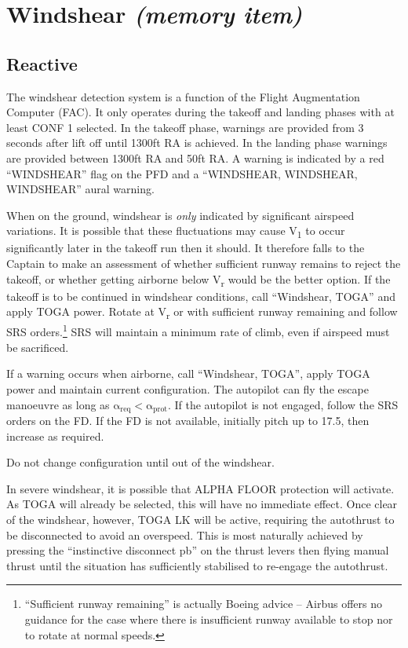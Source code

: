 \documentclass[a5paper,11pt,twoside]{book}
\newcommand{\multicite}[1]{
  \nopagebreak
  \noindent{\footnotesize\color{blue}{[ #1 ]}}
}
\newcommand{\V}[1]{V\textsubscript{#1}}
\begin{document}
\multicite{EOMB~3.80.2, QRH~AEP.MISC, FCOM~AEP.MISC, FCTM~AEP.MISC}


\section{Windshear \emph{(memory item)}}

\subsection{Reactive}

The windshear detection system is a function of the Flight Augmentation Computer
(FAC). It only operates during the takeoff and landing phases with at least CONF
1 selected. In the takeoff phase, warnings are provided from 3 seconds after
lift off until 1300ft RA is achieved. In the landing phase warnings are provided
between 1300ft RA and 50ft RA. A warning is indicated by a red ``WINDSHEAR'' flag
on the PFD and a ``WINDSHEAR, WINDSHEAR, WINDSHEAR'' aural warning.

 When on the ground, windshear is \emph{only} indicated by significant airspeed
 variations. It is possible that these fluctuations may cause \V{1} to occur
 significantly later in the takeoff run then it should. It therefore falls to
 the Captain to make an assessment of whether sufficient runway remains to
 reject the takeoff, or whether getting airborne below \V{r} would be the better
 option. If the takeoff is to be continued in windshear conditions, call
 ``Windshear, TOGA'' and apply TOGA power.  Rotate at \V{r} or with sufficient
 runway remaining and follow SRS orders.\footnote{``Sufficient runway remaining''
 is actually Boeing advice – Airbus offers no guidance for the case where there
 is insufficient runway available to stop nor to rotate at normal speeds.} SRS
 will maintain a minimum rate of climb, even if airspeed must be sacrificed.

If a warning occurs when airborne, call ``Windshear, TOGA'', apply TOGA power and
maintain current configuration. The autopilot can fly the escape manoeuvre as
long as \mbox{$\mathrm{\alpha_{req}<\alpha_{prot}}$}. If the
autopilot is not engaged, follow the SRS orders on the FD. If the FD is not
available, initially pitch up to 17.5\textdegree, then increase as required.

Do not change configuration until out of the windshear.

In severe windshear, it is possible that ALPHA FLOOR protection will
activate. As TOGA will already be selected, this will have no immediate
effect. Once clear of the windshear, however, TOGA LK will be active, requiring
the autothrust to be disconnected to avoid an overspeed. This is most naturally
achieved by pressing the ``instinctive disconnect pb'' on the thrust levers then
flying manual thrust until the situation has sufficiently stabilised to
re-engage the autothrust.
\end{document}
